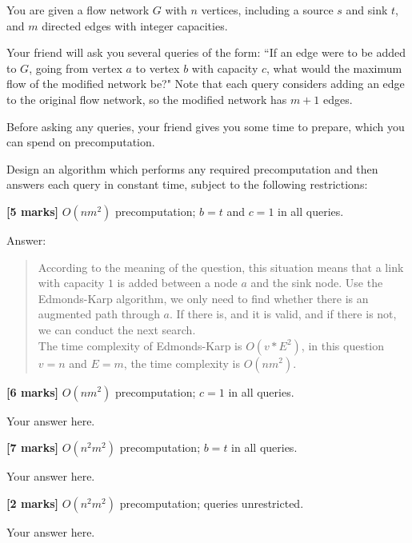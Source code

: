 \documentclass{article}
\begin{document}
\setcounter{question}{3}

\begin{Question}
You are given a flow network $G$ with $n$ vertices, including a source $s$ and sink $t$, and $m$ directed edges with integer capacities.

Your friend will ask you several queries of the form: ``If an edge were to be added to $G$, going from vertex $a$ to vertex $b$ with capacity $c$, what would the maximum flow of the modified network be?" Note that each query considers adding an edge to the original flow network, so the modified network has $m+1$ edges.

Before asking any queries, your friend gives you some time to prepare, which you can spend on precomputation.

Design an algorithm which performs any required precomputation and then answers each query in constant time, subject to the following restrictions:

\begin{Subquestion}
\textbf{[5 marks]} $O(n m^2)$ precomputation; $b = t$ and $c = 1$ in all queries.

\begin{answer}
Answer:
\begin{quote}
    According to the meaning of the question, this situation means that a link with capacity $1$ is added between a node $a$ and the sink node. Use the Edmonds-Karp algorithm, we only need to find whether there is an augmented path through $a$. If there is, and it is valid, and if there is not, we can conduct the next search.\\
    The time complexity of Edmonds-Karp is $O(v*E^2)$, in this question $v = n$ and $E = m$, the time complexity is $O(nm^2)$.\\

\end{quote}
\end{answer}
\end{Subquestion}

\begin{Subquestion}
\textbf{[6 marks]} $O(n m^2)$ precomputation; $c = 1$ in all queries.

\begin{answer}
Your answer here.
\end{answer}
\end{Subquestion}

\begin{Subquestion}
\textbf{[7 marks]} $O(n^2 m^2)$ precomputation; $b = t$ in all queries.

\begin{answer}
Your answer here.
\end{answer}
\end{Subquestion}

\begin{Subquestion}
\textbf{[2 marks]} $O(n^2 m^2)$ precomputation; queries unrestricted.

\begin{answer}
Your answer here.
\end{answer}
\end{Subquestion}
\end{Question}
\end{document}
